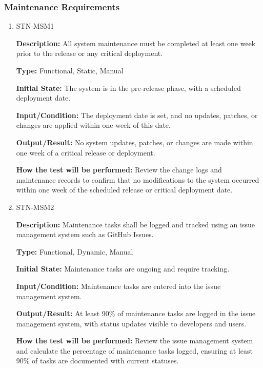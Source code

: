 \documentclass[12pt, titlepage]{article}
\begin{document}
\subsubsection{Maintenance Requirements}

\begin{enumerate}

\item{STN-MSM1\\}

\textbf{Description:} All system maintenance must be completed at least one week prior to the release or any critical deployment.

\textbf{Type:} Functional, Static, Manual

\textbf{Initial State:} The system is in the pre-release phase, with a scheduled deployment date.

\textbf{Input/Condition:} The deployment date is set, and no updates, patches, or changes are applied within one week of this date.

\textbf{Output/Result:} No system updates, patches, or changes are made within one week of a critical release or deployment.

\textbf{How the test will be performed:} Review the change logs and maintenance records to confirm that no modifications to the system occurred within one week of the scheduled release or critical deployment date.

\item{STN-MSM2\\}

\textbf{Description:} Maintenance tasks shall be logged and tracked using an issue management system such as GitHub Issues.

\textbf{Type:} Functional, Dynamic, Manual

\textbf{Initial State:} Maintenance tasks are ongoing and require tracking.

\textbf{Input/Condition:} Maintenance tasks are entered into the issue management system.

\textbf{Output/Result:} At least 90\% of maintenance tasks are logged in the issue management system, with status updates visible to developers and users.

\textbf{How the test will be performed:} Review the issue management system and calculate the percentage of maintenance tasks logged, ensuring at least 90\% of tasks are documented with current statuses.

\end{enumerate}
\end{document}
